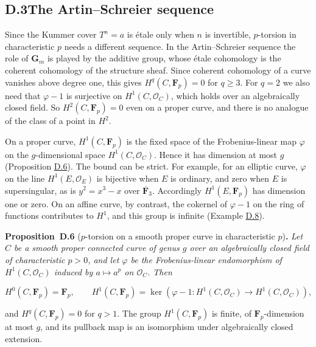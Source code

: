 \documentclass[11pt]{article}
\newenvironment{bpstatement}[2]{\par\addvspace{0.6\baselineskip}\noindent\textbf{#1}#2\textbf{.}\enspace\ignorespaces}
  {\par\addvspace{0.4\baselineskip}}
\newenvironment{bpstatementit}[2]{\begin{bpstatement}{#1}{#2}\itshape\ignorespaces}{\end{bpstatement}}
\begin{document}
\subsection*{\texorpdfstring{D.3\quad The Artin–Schreier sequence}{D.3 The Artin–Schreier sequence}}
\label{bp189}%
\label{bp190}%
Since the Kummer cover \(T^n=a\) is étale only when \(n\) is invertible, \(p\)-torsion in characteristic \(p\) needs a different sequence. In the Artin–Schreier sequence the role of \(\mathbf G_m\) is played by the additive group, whose étale cohomology is the coherent cohomology of the structure sheaf. Since coherent cohomology of a curve vanishes above degree one, this gives \(H^q(C,\mathbf F_p)=0\) for \(q\geq3\). For \(q=2\) we also need that \(\varphi-1\) is surjective on \(H^1(C,\mathcal O_C)\), which holds over an algebraically closed field. So \(H^2(C,\mathbf F_p)=0\) even on a proper curve, and there is no analogue of the class of a point in \(H^2\).

On a proper curve, \(H^1(C,\mathbf F_p)\) is the fixed space of the Frobenius-linear map \(\varphi\) on the \(g\)-dimensional space \(H^1(C,\mathcal O_C)\). Hence it has dimension at most \(g\) (Proposition \hyperref[bp191]{D.6}). The bound can be strict. For example, for an elliptic curve, \(\varphi\) on the line \(H^1(E,\mathcal O_E)\) is bijective when \(E\) is ordinary, and zero when \(E\) is supersingular, as is \(y^2=x^3-x\) over \(\overline{\mathbf F}_3\). Accordingly \(H^1(E,\mathbf F_p)\) has dimension one or zero. On an affine curve, by contrast, the cokernel of \(\varphi-1\) on the ring of functions contributes to \(H^1\), and this group is infinite (Example \hyperref[bp197]{D.8}).

\label{bp191}%
\begin{bpstatementit}{Proposition~D.6}{ ($p$-torsion on a smooth proper curve in characteristic $p$)}
Let \(C\) be a smooth proper connected curve of genus \(g\) over an algebraically closed field of characteristic \(p>0\), and let \(\varphi\) be the Frobenius-linear endomorphism of \(H^1(C,\mathcal O_C)\) induced by \(a\mapsto a^p\) on \(\mathcal O_C\).  Then

\[
H^0(C,\mathbf F_p)=\mathbf F_p,\qquad
H^1(C,\mathbf F_p)=
\ker(\varphi-1:H^1(C,\mathcal O_C)\to H^1(C,\mathcal O_C)),
\]

and \(H^q(C,\mathbf F_p)=0\) for \(q>1\).  The group \(H^1(C,\mathbf F_p)\) is finite, of \(\mathbf F_p\)-dimension at most \(g\), and its pullback map is an isomorphism under algebraically closed extension.
\end{bpstatementit}
\end{document}
